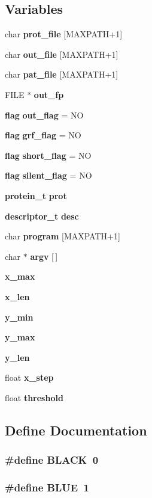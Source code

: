 \subsection*{Variables}
\begin{CompactItemize}
\item 
char {\bf prot\_\-file} [MAXPATH+1]
\item 
char {\bf out\_\-file} [MAXPATH+1]
\item 
char {\bf pat\_\-file} [MAXPATH+1]
\item 
FILE $\ast$ {\bf out\_\-fp}
\item 
{\bf flag} {\bf out\_\-flag} = NO
\item 
{\bf flag} {\bf grf\_\-flag} = NO
\item 
{\bf flag} {\bf short\_\-flag} = NO
\item 
{\bf flag} {\bf silent\_\-flag} = NO
\item 
{\bf protein\_\-t} {\bf prot}
\item 
{\bf descriptor\_\-t} {\bf desc}
\item 
char {\bf program} [MAXPATH+1]
\item 
char $\ast$ {\bf argv} [$\,$]
\item 
{\bf x\_\-max}
\item 
{\bf x\_\-len}
\item 
{\bf y\_\-min}
\item 
{\bf y\_\-max}
\item 
{\bf y\_\-len}
\item 
float {\bf x\_\-step}
\item 
float {\bf threshold}
\end{CompactItemize}


\subsection{Define Documentation}
\subsubsection{\setlength{\rightskip}{0pt plus 5cm}\#define BLACK\ 0}\label{Pilar__8_8c_a2}


\subsubsection{\setlength{\rightskip}{0pt plus 5cm}\#define BLUE\ 1}\label{Pilar__8_8c_a3}



